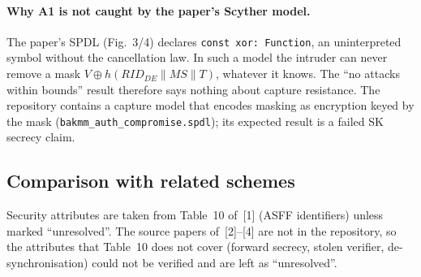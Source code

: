 \paragraph{Why A1 is not caught by the paper's Scyther model.}
The paper's SPDL (Fig.~3/4) declares \texttt{const xor: Function}, an uninterpreted symbol without the cancellation
law. In such a model the intruder can never remove a mask $V\oplus h(RID_{DE}\|MS\|T)$, whatever it knows.
The ``no attacks within bounds'' result therefore says nothing about capture resistance.
The repository contains a capture model that encodes masking as encryption keyed by the mask
(\texttt{bakmm\_auth\_compromise.spdl}); its expected result is a failed SK secrecy claim.

\subsection{Comparison with related schemes}
\label{subsec:w3-related}

Security attributes are taken from Table~10 of~[1] (ASFF identifiers) unless marked ``unresolved''.
The source papers of~[2]--[4] are not in the repository, so the attributes that Table~10 does not cover
(forward secrecy, stolen verifier, de-synchronisation) could not be verified and are left as ``unresolved''.

